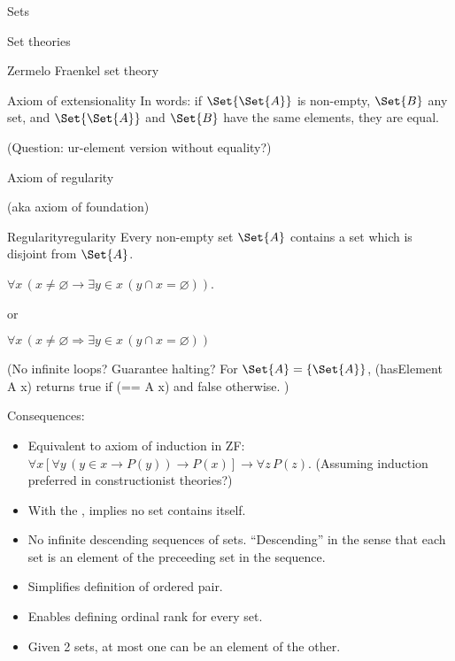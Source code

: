 \begin{plSection}{Sets}
\begin{plSection}{Set theories}
\begin{plSection}{Zermelo Fraenkel set theory}
\begin{plSection}{Axiom of extensionality}
In words: 
if $\Set{\Set{A}}$ is non-empty, $\Set{B}$ any set, 
and $\Set{\Set{A}}$ and $\Set{B}$ have the same
elements, they are equal.

(Question: ur-element version without equality?)

\end{plSection}%
\begin{plSection}{Axiom of regularity}

(aka axiom of foundation)~\cite{wiki:AxiomOfRegularity}

\begin{plAxiom}{Regularity}{regularity}
Every non-empty set $\Set{A}$ contains a set 
which is disjoint from $\Set{A}$.

$\forall x\,(x \neq \varnothing
\rightarrow 
\exists y\in x\,(y\cap x=\varnothing ))$.
 
or
 
$\forall x\,(x\neq \varnothing \Rightarrow 
 \exists y\in x\,(y\cap x=\varnothing ))$
 \end{plAxiom}
 
(No infinite loops? Guarantee halting? 
For $\Set{A} = \left\{\Set{A}\right\}$,
\textsf{(hasElement A x)} 
returns \textsf{true} if \textsf{(== A x)}
and \textsf{false} otherwise. )

Consequences:
\begin{itemize}
\item 
Equivalent to axiom of induction\cite{wiki:EpsilonInduction} 
in \textsf{ZF}:
$\forall x
[\forall y\,(y\in x\rightarrow P(y))\rightarrow P(x)]
\rightarrow \forall z\,P(z)$.
(Assuming induction preferred in constructionist theories?)

\item With the , 
implies no set contains itself.

\item No infinite descending sequences of sets.
``Descending'' in the sense that each set is an element of the
preceeding set in the sequence.

\item Simplifies definition of ordered pair.

\item Enables defining ordinal rank for every set.

\item Given 2 sets, at most one can be an element of the other.
\end{itemize}


\end{plSection}
\end{plSection}
\end{plSection}
\end{plSection}
